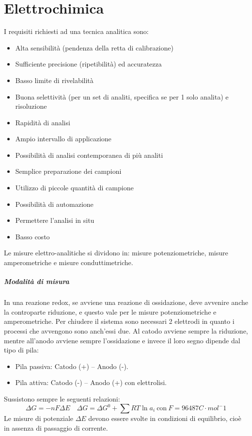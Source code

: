 \chapter{Elettrochimica}
I requisiti richiesti ad una tecnica analitica sono:
\begin{itemize}
\item Alta sensibilità (pendenza della retta di calibrazione)
\item Sufficiente precisione (ripetibilità) ed accuratezza
\item Basso limite di rivelabilità
\item Buona selettività (per un set di analiti, specifica se per 1 solo analita) e risoluzione
\item Rapidità di analisi
\item Ampio intervallo di applicazione
\item Possibilità di analisi contemporanea di più analiti
\item Semplice preparazione dei campioni
\item Utilizzo di piccole quantità di campione
\item Possibilità di automazione
\item Permettere l'analisi in situ
\item Basso costo
\end{itemize}
Le misure elettro-analitiche si dividono in: misure potenziometriche, misure amperometriche e misure conduttimetriche.



\paragraph{Modalità di misura}
In una reazione redox, se avviene una reazione di ossidazione, deve avvenire anche la controparte riduzione, e questo vale per le misure potenziometriche e amperometriche.
Per chiudere il sistema sono necessari 2 elettrodi in quanto i processi che avvengono sono anch'essi due.
Al catodo avviene sempre la riduzione, mentre all'anodo avviene sempre l'ossidazione e invece il loro segno dipende dal tipo di pila:
\begin{itemize}
\item Pila passiva:  Catodo (+) – Anodo (-).
\item Pila attiva: Catodo (-) – Anodo (+) con elettrolisi.
\end{itemize}

Sussistono sempre le seguenti relazioni:
\[
\Delta G = -nF \Delta E \quad \Delta G = \Delta G^0 + \sum RT \ln a_i \: \text{con} \: F = 96487 C \cdot mol^-1
\]
Le misure di potenziale $\Delta E$ devono essere svolte in condizioni di equilibrio, cioè in assenza di passaggio di corrente.



